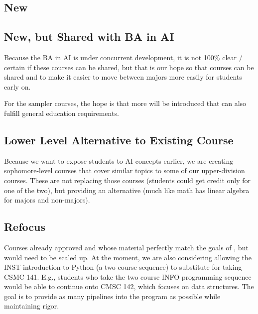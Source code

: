 \documentclass[
10pt, %
a4paper, %
oneside, %
headinclude,footinclude, %
BCOR5mm, %
]{scrartcl}
\begin{document}
  \subsection{New}

  

  \subsection{New, but Shared with BA in AI}

  Because the BA in AI is under concurrent development, it is not 100\% clear / certain if these courses can be shared, but that is our hope so that courses can be shared and to make it easier to move between majors more easily for students early on.  

  For the sampler courses, the hope is that more will be introduced that can also fulfill general education requirements.

  

    \subsection{Lower Level Alternative to Existing Course}

    Because we want to expose students to AI concepts earlier, we are creating sophomore-level courses that cover similar topics to some of our upper-division courses.  These are not replacing those courses (students could get credit only for one of the two), but providing an alternative (much like math has linear algebra for majors and non-majors).

    



  \subsection{Refocus}

    Courses already approved and whose material perfectly match the goals of \short{}, but would need to be scaled up.  At the moment, we are also considering allowing the INST introduction to Python (a two course sequence) to substitute for taking CSMC 141.  E.g., students who take the two course INFO programming sequence would be able to continue onto CMSC 142, which focuses on data structures.  The goal is to provide as many pipelines into the program as possible while maintaining rigor.
    
\end{document}
